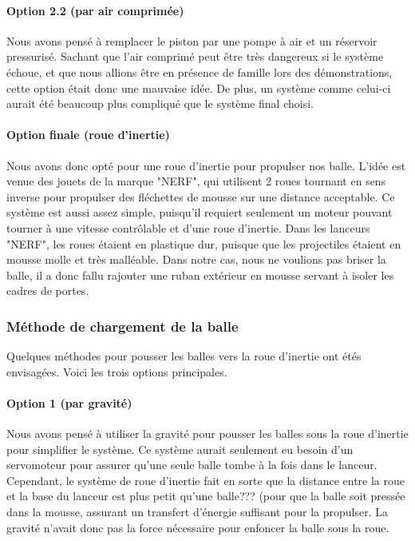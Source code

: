 \paragraph{Option 2.2 (par air comprimée)}
Nous avons pensé à remplacer le piston par une pompe à air et un réservoir pressurisé.
Sachant que l’air comprimé peut être très dangereux si le système échoue, et que nous allions être en présence de famille lors des démonstrations, cette option était donc une mauvaise idée.
De plus, un système comme celui-ci aurait été beaucoup plus compliqué que le système final choisi.

\paragraph{Option finale (roue d’inertie)}
Nous avons donc opté pour une roue d’inertie pour propulser nos balle.
L’idée est venue des jouets de la marque "NERF", qui utilisent 2 roues tournant en sens inverse pour propulser des fléchettes de mousse sur une distance acceptable.
Ce système est aussi assez simple, puisqu’il requiert seulement un moteur pouvant tourner à une vitesse contrôlable et d’une roue d’inertie.
Dans les lanceurs "NERF", les roues étaient en plastique dur, puisque que les projectiles étaient en mousse molle et très malléable.
Dans notre cas, nous ne voulions pas briser la balle, il a donc fallu rajouter une ruban extérieur en mousse servant à isoler les cadres de portes.


\subsubsection{Méthode de chargement de la balle}
Quelques méthodes pour pousser les balles vers la roue d’inertie ont étés envisagées.
Voici les trois options principales.

\paragraph{Option 1 (par gravité)}
Nous avons pensé à utiliser la gravité pour pousser les balles sous la roue d’inertie pour simplifier le système.
Ce système aurait seulement eu besoin d’un servomoteur pour assurer qu’une seule balle tombe à la fois dans le lanceur.
Cependant, le système de roue d’inertie fait en sorte que la distance entre la roue et la base du lanceur est plus petit qu’une balle??? (pour que la balle soit pressée dans la mousse, assurant un transfert d’énergie suffisant pour la propulser.
La gravité n’avait donc pas la force nécessaire pour enfoncer la balle sous la roue.

